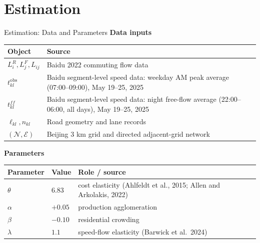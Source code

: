 \documentclass[11pt,aspectratio=169]{beamer}
\newcommand{\navfwd}[1]{\par\vspace{0.35em}\noindent\hfill\hyperlink{#1}{\beamergotobutton{details}}}
\begin{document}
\section{Estimation}\label{sec:quant}
\begin{frame}[label=estparams]{Estimation: Data and Parameters}
\small
\textbf{Data inputs}
\vspace{0.25em}

\scriptsize
\begin{tabularx}{0.92\textwidth}{@{}p{}X@{}}
\toprule
Object & Source \\
\midrule
$L_i^R,L_j^F,L_{ij}$ & Baidu 2022 commuting flow data \\
$t_{kl}^{\mathrm{obs}}$ & Baidu segment-level speed data: weekday AM peak average (07:00--09:00), May 19--25, 2025 \\
$t_{kl}^{ff}$ & Baidu segment-level speed data: night free-flow average (22:00--06:00, all days), May 19--25, 2025 \\
$\ell_{kl},n_{kl}$ & Road geometry and lane records \\
$(\mathcal N,\mathcal E)$ & Beijing 3 km grid and directed adjacent-grid network \\
\bottomrule
\end{tabularx}

\vspace{1.0em}
\textbf{Parameters}
\vspace{0.25em}

\scriptsize
\begin{tabularx}{0.92\textwidth}{@{}p{}p{}X@{}}
\toprule
Parameter & Value & Role / source \\
\midrule
$\theta$ & $6.83$ & cost elasticity (Ahlfeldt et al., 2015; Allen and Arkolakis, 2022) \\
$\alpha$ & $+0.05$ & production agglomeration \\
$\beta$ & $-0.10$ & residential crowding \\
$\lambda$ & $1.1$ & speed-flow elasticity (Barwick et al.\ 2024) \\
\bottomrule
\end{tabularx}
\navfwd{appparams}
\end{frame}
\end{document}
